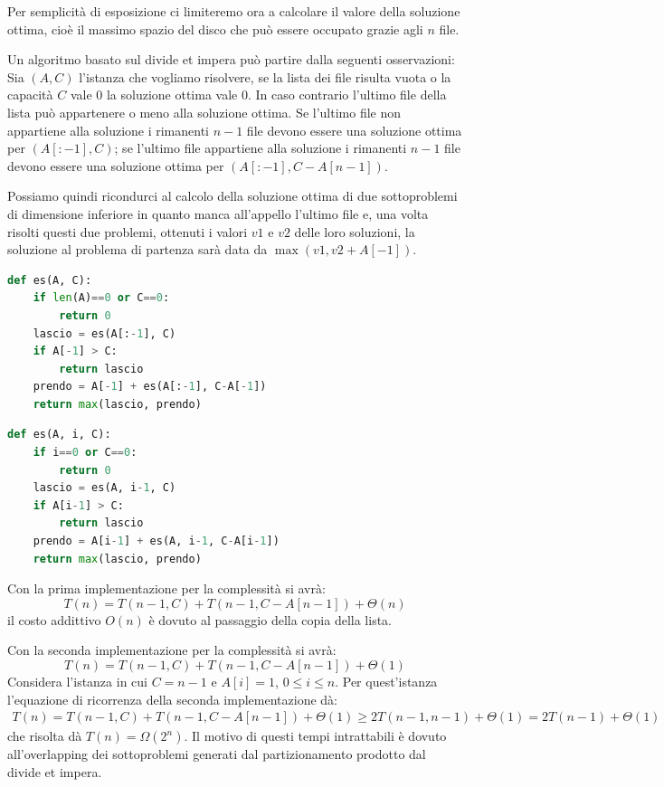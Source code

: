 Per semplicità di esposizione ci limiteremo ora a calcolare il valore della soluzione ottima, cioè il massimo spazio del disco che può essere occupato grazie agli $n$ file. 

Un algoritmo basato sul divide et impera può partire dalla seguenti osservazioni: Sia $(A, C)$ l'istanza che vogliamo risolvere, se la lista dei file risulta vuota o la capacità $C$ vale 0 la soluzione ottima vale 0. In caso contrario l'ultimo file della lista può appartenere o meno alla soluzione ottima. Se l'ultimo file non appartiene alla soluzione i rimanenti $n-1$ file devono essere una soluzione ottima per $(A[:-1], C)$; se l'ultimo file appartiene alla soluzione i rimanenti $n-1$ file devono essere una soluzione ottima per $(A[:-1], C-A[n-1])$.

Possiamo quindi ricondurci al calcolo della soluzione ottima di due sottoproblemi di dimensione inferiore in quanto manca all'appello l'ultimo file e, una volta risolti questi due problemi, ottenuti i valori $v1$ e $v2$ delle loro soluzioni, la soluzione al problema di partenza sarà data da $\max(v1, v2 + A[-1])$.

\begin{minipage}[t]{0.50\textwidth}
\begin{lstlisting}[language=Python]
def es(A, C):
    if len(A)==0 or C==0:
        return 0
    lascio = es(A[:-1], C)
    if A[-1] > C:
        return lascio
    prendo = A[-1] + es(A[:-1], C-A[-1])
    return max(lascio, prendo)
\end{lstlisting}
\end{minipage}
\begin{minipage}[t]{0.50\textwidth}
\begin{lstlisting}[language=Python]
def es(A, i, C):
    if i==0 or C==0:
        return 0
    lascio = es(A, i-1, C)
    if A[i-1] > C:
        return lascio
    prendo = A[i-1] + es(A, i-1, C-A[i-1])
    return max(lascio, prendo)
\end{lstlisting}
\end{minipage}
Con la prima implementazione per la complessità si avrà:
\begin{equation*}
    T(n) = T(n - 1, C) + T(n - 1, C - A[n - 1]) + \Theta(n)
\end{equation*}
il costo addittivo $O(n)$ è dovuto al passaggio della copia della lista.

Con la seconda implementazione per la complessità si avrà:
\begin{equation*}
    T(n) = T(n - 1, C) + T(n - 1, C - A[n - 1]) + \Theta(1)
\end{equation*}
Considera l'istanza in cui $C=n-1$ e $A[i]=1$, $0\leq i\leq n$. Per quest'istanza l'equazione di ricorrenza della seconda implementazione dà:
\begin{align*}
    T(n) = T(n - 1, C) + T(n - 1, C - A[n - 1]) + \Theta(1) \geq 2T(n - 1, n - 1) + \Theta(1) = 2T(n - 1) + \Theta(1)
\end{align*}
che risolta dà $T(n)=\Omega(2^n)$. Il motivo di questi tempi intrattabili è dovuto all'overlapping dei sottoproblemi generati dal partizionamento prodotto dal divide et impera.


